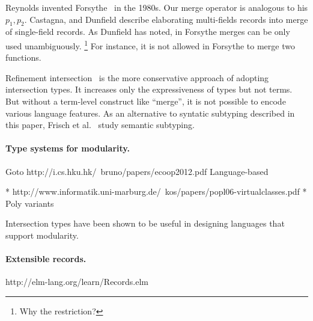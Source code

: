 Reynolds invented Forsythe~\cite{reynolds1997design} in the 1980s. Our merge
operator is analogous to his $ p_1, p_2 $. Castagna, and Dunfield describe
elaborating multi-fields records into merge of single-field records. As Dunfield
has noted, in Forsythe merges can be only used unambiguously. \footnote{Why the
  restriction?} For instance, it is not allowed in Forsythe to merge two
functions.



Refinement
intersection~\cite{dunfield2007refined,davies2005practical,freeman1991refinement}
is the more conservative approach of adopting intersection types. It increases
only the expressiveness of types but not terms. But without a term-level
construct like ``merge'', it is not possible to encode various language
features. As an alternative to syntatic subtyping described in this paper,
Frisch et al.~\cite{frisch2008semantic} study semantic subtyping.

\paragraph{Type systems for modularity.}

Goto http://i.cs.hku.hk/~bruno/papers/ecoop2012.pdf Language-based

* http://www.informatik.uni-marburg.de/~kos/papers/popl06-virtualclasses.pdf
* Poly variants

Intersection types have been shown to be useful in designing languages that
support modularity.~\cite{nystrom2006j}

\paragraph{Extensible records.}

http://elm-lang.org/learn/Records.elm

